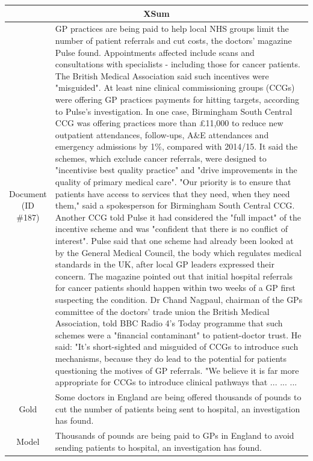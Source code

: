 \begin{table}[bth!]
\scriptsize
\centering
\renewcommand{\arraystretch}{1.3}
\begin{tabular}{c|p{}}
\hline
\multicolumn{2}{c}{XSum} \\ \hline
\makecell{Document\\(ID \#187)} & 
GP practices are being paid to help local NHS groups limit the number of patient referrals and cut costs, the doctors' magazine Pulse found. Appointments affected include scans and consultations with specialists - including those for cancer patients. The British Medical Association said such incentives were "misguided". At least nine clinical commissioning groups (CCGs) were offering GP practices payments for hitting targets, according to Pulse's investigation. In one case, Birmingham South Central CCG was offering practices more than   £11,000 to reduce new outpatient attendances, follow-ups, A\&E attendances and emergency admissions by 1\%, compared with 2014/15. It said the schemes, which exclude cancer referrals, were designed to "incentivise best quality practice" and "drive improvements in the quality of primary medical care". "Our priority is to ensure that patients have access to services that they need, when they need them," said a spokesperson for Birmingham South Central CCG. Another CCG told Pulse it had considered the "full impact" of the incentive scheme and was "confident that there is no conflict of interest". Pulse said that one scheme had already been looked at by the General Medical Council, the body which regulates medical standards in the UK, after local GP leaders expressed their concern. The magazine pointed out that initial hospital referrals for cancer patients should happen within two weeks of a GP first suspecting the condition. Dr Chand Nagpaul, chairman of the GPs committee of the doctors' trade union the British Medical Association, told BBC Radio 4's Today programme that such schemes were a "financial contaminant" to patient-doctor trust. He said: "It's short-sighted and misguided of CCGs to introduce such mechanisms, because they do lead to the potential for patients questioning the motives of GP referrals. "We believe it is far more appropriate for CCGs to introduce clinical pathways that ... ... ... 
\\ \hline
Gold & 
Some doctors in England are being offered thousands of pounds to cut the number of patients being sent to hospital, an investigation has found.
\\ \hline
Model & 
Thousands of pounds are being paid to GPs in England to avoid sending patients to hospital, an investigation has found.

\end{tabular}
\end{table}
